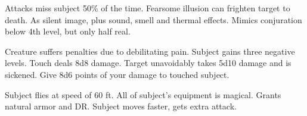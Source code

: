 \begin{swspelllist}
   Attacks miss subject 50\% of the time.
   Fearsome illusion can frighten target to death.
   As silent image, plus sound, smell and thermal effects.
   Mimics conjuration below 4th level, but only half real.

   Creature suffers penalties due to debilitating pain.
   Subject gains three negative levels.
   Touch deals 8d8 damage.
   Target unavoidably takes 5d10 damage and is sickened.
   Give 8d6 points of your damage to touched subject.

   Subject flies at speed of 60 ft.
   All of subject's equipment is magical.
   Grants natural armor and DR.
   Subject moves faster, gets extra attack.
  \spellheadrestricted{}
\end{swspelllist}

